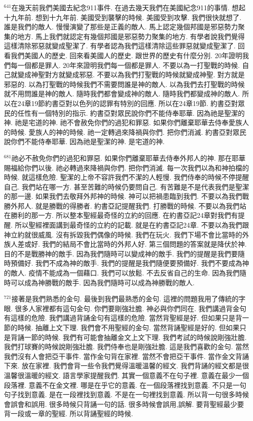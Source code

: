 \documentclass{book}
\begin{document}
$^{641}$在幾天前我們美國去紀念911事件.
在過去幾天我們在美國紀念911的事情.
想起十九年前.
想到十九年前.
美國受到襲擊的時候.
美國受到攻擊.
我們很快就想了.
誰是我們的敵人.
慢慢演變了那些是正義的敵人.
馬上認定幾個邦國是邪惡勢力聚集的地方.
馬上我們就認定有幾個邦國是邪惡勢力聚集的地方.
有學者說我們覺得這樣清除邪惡就變成聖潔了.
有學者認為我們這樣清除這些罪惡就變成聖潔了.
回看我們美國人的歷史.
回來看美國人的歷史.
跟世界的歷史有什麼分別.
20年證明我們每一個都是罪人.
20年來證明我們每一個都是罪人.
不要以為一打聖戰的時候.
自己就變成神聖對方就變成邪惡.
不要以為我們打聖戰的時候就變成神聖.
對方就是邪惡的.
以為打聖戰的時候我們不需要問誰是神的敵人.
以為我們去打聖戰的時候就不用問誰是神的敵人.
隨時我們都會變成神的敵人.
隨時我們都變成神的敵人.
所以在24章19節約書亞對以色列的認罪有特別的回應.
所以在24章19節.
約書亞對眾民的任性有一個特別的指示.
約書亞對眾民說你們不能侍奉耶華.
因為祂是聖潔的神.
祂是宅道的神.
祂不會赦免你們的過犯和罪惡.
如果你們離棄耶華去侍奉愛族人的時候.
愛族人的神的時候.
祂一定轉過來降禍與你們.
把你們消滅.
約書亞對眾民說你們不能侍奉耶華.
因為祂是聖潔的神.
是宅道的神.

$^{681}$祂必不赦免你們的過犯和罪惡.
如果你們離棄耶華去侍奉外邦人的神.
那在耶華賜福給你們以後.
祂必轉過來降禍與你們.
把你們消滅.
每一次我們以為和神拍檔的時候.
就這樣危險.
聖潔的上帝不容許我們不潔的人輕慢.
我們侍奉的時候不停提醒自己.
我們站在哪一方.
甚至苦難的時候仍要問自己.
有苦難是不是代表我們是聖潔的那一邊.
如果我們去敬拜外邦神的時候.
神可以把禍患臨到我們.
不要以為我們戰勝外邦人.
就是勝戰的得勝者.
約書亞記提醒我們.
打勝戰的時候.
不要以為我們站在勝利的那一方.
所以整本聖經最奇怪的立約的回應.
在約書亞記24章對我們有提醒.
所以聖經裡面講到最奇怪的立約的記載.
就是在約書亞記24章.
不要以為我們跟神立約就很威風.
沒有拆毀我們偶像的時候.
我們在玩火.
我們下場不會比當時的外族人差或好.
我們的結局不會比當時的外邦人好.
第三個問題的答案就是降伏於神.
目的不是戰勝神的敵手.
因為我們隨時可以變成神的敵手.
我們的提醒是我們要隨時預備好.
我們不成為神的敵手.
我們的提醒是我們隨便要預備好.
我們不要成為神的敵人.
疫情不能成為一個藉口.
我們可以放鬆.
不去反省自己的生命.
因為我們隨時可以成為神勝戰的敵手.
因為我們隨時可以成為神勝戰的敵人.

$^{721}$接著是我們熟悉的金句.
最後到我們最熟悉的金句.
這裡的問題我用了傳統的字眼.
很多人家裡都有這句金句.
你們要剛強壯膽.
神必與你們同在.
我們講過背金句有這樣的危險.
我們講過背誦金句有這樣的危險.
當然背聖經是好.
但如果只是背一節的時候.
抽離上文下理.
我們會不用聖經的金句.
當然背誦聖經是好的.
但如果只是背誦一節的時候.
我們有可能會抽離金文上文下理.
我們考試的時候說剛強壯膽.
我們打球賽的時候說剛強壯膽.
我們侍奉也是剛強壯膽.
這是我們喜歡的金句.
當然我們沒有人會把亞干事件.
當作金句背在家裡.
當然不會把亞干事件.
當作金文背誦下來.
放在家裡.
我們會背一些令我們覺得溫暖溫馨的經文.
我們背誦的經文都是很溫馨很溫暖的經文.
語言學家提醒我們.
其實一個意義不在句子裡.
意義在最少一個段落裡.
意義不在金文裡.
哪是在乎它的意義.
在一個段落裡找到意義.
不只是一句句子找到意義.
是在一段裡找到意義.
不是在一句裡找到意義.
所以背一句很多時候會誤會和誤用.
很多時候只背誦一句的話.
很多時候會誤用,誤解.
要背聖經最少要背一段或一章的聖經.
所以背誦聖經的時候.
\end{document}
